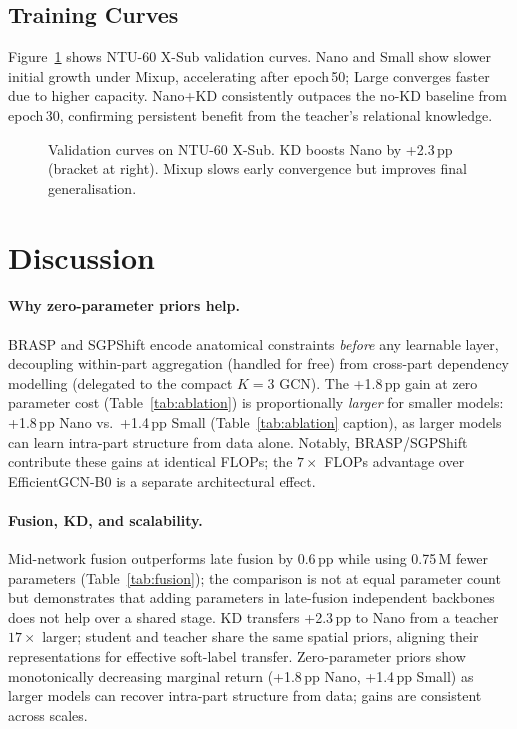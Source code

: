 \documentclass[sigconf,screen,review,anonymous]{acmart}
\begin{document}
\subsection{Training Curves}\label{sec:curves}

Figure~\ref{fig:curves} shows NTU-60 X-Sub validation curves.
Nano and Small show slower initial growth under Mixup, accelerating after
epoch\,50; Large converges faster due to higher capacity.
Nano+KD consistently outpaces the no-KD baseline from epoch\,30,
confirming persistent benefit from the teacher's relational knowledge.

\begin{figure}[b]
\centering
\resizebox{\columnwidth}{!}{}
\caption{Validation curves on NTU-60 X-Sub.
  KD boosts Nano by +2.3\,pp (bracket at right).
  Mixup slows early convergence but improves final generalisation.}
\label{fig:curves}
\vspace{-3mm}\end{figure}

\section{Discussion}\label{sec:discuss}

\paragraph{Why zero-parameter priors help.}
BRASP and SGPShift encode anatomical constraints \emph{before} any learnable layer,
decoupling within-part aggregation (handled for free) from cross-part dependency
modelling (delegated to the compact $K{=}3$ GCN).
The +1.8\,pp gain at zero parameter cost (Table~\ref{tab:ablation}) is proportionally
\emph{larger} for smaller models: +1.8\,pp Nano vs.\ +1.4\,pp Small
(Table~\ref{tab:ablation} caption), as larger models can learn
intra-part structure from data alone.
Notably, BRASP/SGPShift contribute these gains at identical FLOPs; the $7{\times}$
FLOPs advantage over EfficientGCN-B0 is a separate architectural effect.

\paragraph{Fusion, KD, and scalability.}
Mid-network fusion outperforms late fusion by 0.6\,pp while using 0.75\,M
fewer parameters (Table~\ref{tab:fusion}); the comparison is not at equal
parameter count but demonstrates that adding parameters in late-fusion
independent backbones does not help over a shared stage.
KD transfers +2.3\,pp to Nano from a teacher $17{\times}$ larger; student and teacher
share the same spatial priors, aligning their representations for effective soft-label transfer.
Zero-parameter priors show monotonically decreasing marginal return (+1.8\,pp Nano,
+1.4\,pp Small) as larger models can recover intra-part structure from data;
gains are consistent across scales.
\end{document}
